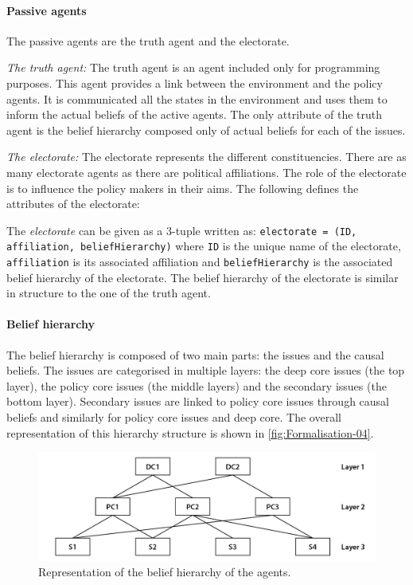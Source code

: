 \documentclass[11pt]{article}
\begin{document}


\paragraph{Passive agents}

The passive agents are the truth agent and the electorate.

\emph{The truth agent:} The truth agent is an agent included only for programming purposes. This agent provides a link between the environment and the policy agents. It is communicated all the states in the environment and uses them to inform the actual beliefs of the active agents. The only attribute of the truth agent is the belief hierarchy composed only of actual beliefs for each of the issues.

\emph{The electorate: } The electorate represents the different constituencies. There are as many electorate agents as there are political affiliations. The role of the electorate is to influence the policy makers in their aims. The following defines the attributes of the electorate:

The \emph{electorate} can be given as a 3-tuple written as: \texttt{electorate = (ID, affiliation, beliefHierarchy)} where \texttt{ID} is the unique name of the electorate, \texttt{affiliation} is its associated affiliation and \texttt{beliefHierarchy} is the associated belief hierarchy of the electorate.  The belief hierarchy of the electorate is similar in structure to the one of the truth agent.


\paragraph{Belief hierarchy}

The belief hierarchy is composed of two main parts: the issues and the causal beliefs. The issues are categorised in multiple layers: the deep core issues (the top layer), the policy core issues (the middle layers) and the secondary issues (the bottom layer). Secondary issues are linked to policy core issues through causal beliefs and similarly for policy core issues and deep core. The overall representation of this hierarchy structure is shown in \autoref{fig:Formalisation-04}.

\begin{figure}
\centering
\includegraphics[width = 0.95\linewidth, angle = 0]{figures/Formalisation-04}
\caption{Representation of the belief hierarchy of the agents.}
\label{fig:Formalisation-04}
\end{figure}
\end{document}
